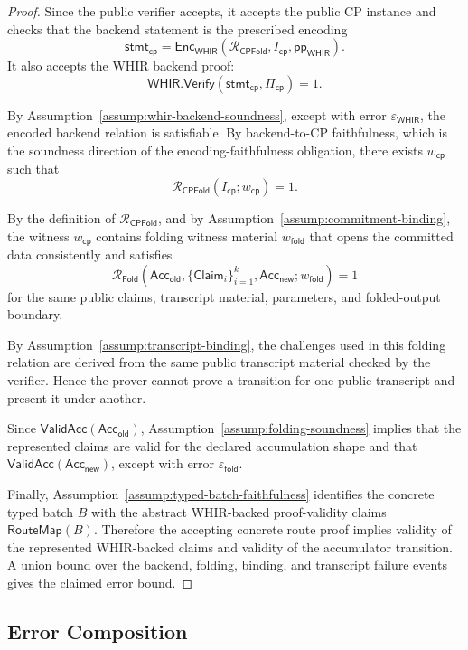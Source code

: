 \documentclass[11pt]{article}
\theoremstyle{definition}
\newcommand{\WHIR}{\mathsf{WHIR}}
\newcommand{\Acc}{\mathsf{Acc}}
\newcommand{\Verify}{\mathsf{Verify}}
\newcommand{\Rfold}{\mathcal{R}_{\mathsf{Fold}}}
\newcommand{\Rcp}{\mathcal{R}_{\mathsf{CPFold}}}
\begin{document}
\begin{proof}
Since the public verifier accepts, it accepts the public CP instance and checks
that the backend statement is the prescribed encoding
\[
  \mathsf{stmt}_{\mathsf{cp}}
  =
  \mathsf{Enc}_{\WHIR}(\Rcp,I_{\mathsf{cp}},\mathsf{pp}_{\WHIR}).
\]
It also accepts the WHIR backend proof:
\[
  \WHIR.\Verify(\mathsf{stmt}_{\mathsf{cp}},\Pi_{\mathsf{cp}})=1.
\]

By Assumption~\ref{assump:whir-backend-soundness}, except with error
\(\varepsilon_{\WHIR}\), the encoded backend relation is satisfiable. By
backend-to-CP faithfulness, which is the soundness direction of the
encoding-faithfulness obligation, there exists \(w_{\mathsf{cp}}\) such that
\[
  \Rcp(I_{\mathsf{cp}};w_{\mathsf{cp}})=1.
\]

By the definition of \(\Rcp\), and by
Assumption~\ref{assump:commitment-binding}, the witness \(w_{\mathsf{cp}}\)
contains folding witness material \(w_{\mathsf{fold}}\) that opens the committed
data consistently and satisfies
\[
  \Rfold\!\left(
    \Acc_{\mathsf{old}},
    \{\mathsf{Claim}_i\}_{i=1}^k,
    \Acc_{\mathsf{new}};
    w_{\mathsf{fold}}
  \right)=1
\]
for the same public claims, transcript material, parameters, and folded-output
boundary.

By Assumption~\ref{assump:transcript-binding}, the challenges used in this
folding relation are derived from the same public transcript material checked by
the verifier. Hence the prover cannot prove a transition for one public
transcript and present it under another.

Since \(\mathsf{ValidAcc}(\Acc_{\mathsf{old}})\), Assumption~\ref{assump:folding-soundness}
implies that the represented claims are valid for the declared accumulation
shape and that \(\mathsf{ValidAcc}(\Acc_{\mathsf{new}})\), except with error
\(\varepsilon_{\mathsf{fold}}\).

Finally, Assumption~\ref{assump:typed-batch-faithfulness} identifies the
concrete typed batch \(B\) with the abstract WHIR-backed proof-validity claims
\(\mathsf{RouteMap}(B)\). Therefore the accepting concrete route proof implies
validity of the represented WHIR-backed claims and validity of the accumulator
transition. A union bound over the backend, folding, binding, and transcript
failure events gives the claimed error bound.
\end{proof}

\subsection{Error Composition}
\label{sec:error-composition}
\end{document}
